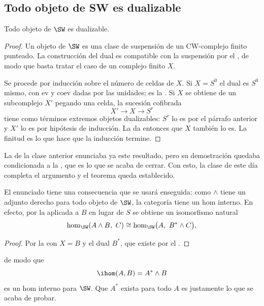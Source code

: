 \subsection{Todo objeto de SW es dualizable}

\begin{teo}\label{teo:todo-dualizable}
Todo objeto de $\SW$ es dualizable.
\end{teo}

\begin{proof}
Un objeto de $\SW$ es una clase de suspensión de un CW-complejo finito punteado. La construcción del dual es compatible con la suspensión por el , de modo que basta tratar el caso de un complejo finito $X$.

Se procede por inducción sobre el número de celdas de $X$. Si $X=S^0$ el dual es $S^0$ mismo, con $\mathrm{ev}$ y $\mathrm{coev}$ dadas por las unidades; es la . Si $X$ se obtiene de un subcomplejo $X'$ pegando una celda, la sucesión cofibrada
\[
X'\longrightarrow X\longrightarrow S^r
\]
tiene como términos extremos objetos dualizables: $S^r$ lo es por el párrafo anterior y $X'$ lo es por hipótesis de inducción. La  da entonces que $X$ también lo es. La finitud es lo que hace que la inducción termine.
\end{proof}

\begin{nota}
   La  de la clase anterior enunciaba ya este resultado, pero su demostración quedaba condicionada a la , que es lo que se acaba de cerrar. Con esto, la clase de este día completa el argumento y el teorema queda establecido.

   El enunciado tiene una consecuencia que se usará enseguida: como $\wedge$ tiene un adjunto derecho para todo objeto de $\SW$, la categoría tiene un hom interno. En efecto, por la  aplicada a $B$ en lugar de $S$ se obtiene un isomorfismo natural
   \[
   \hom_{\SW}(A\wedge B,\ C)\cong\hom_{\SW}\bigl(A,\ B^*\wedge C\bigr),
   \]
   \begin{proof}
   Por la  con $X=B$ y el dual $B^*$, que existe por el .
   \end{proof}
   de modo que
   \[
   \ihom(A,B)=A^*\wedge B
   \]
   es un hom interno para $\SW$. Que $A^*$ exista para todo $A$ es justamente lo que se acaba de probar.
\end{nota}

